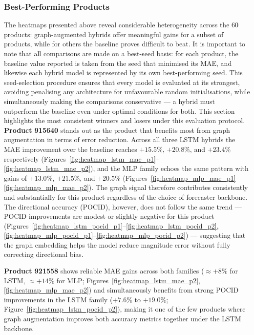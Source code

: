 \subsubsection*{Best-Performing Products}
The heatmaps presented above reveal considerable heterogeneity across the 60 products: 
graph-augmented hybrids offer meaningful gains for a subset of products, while for 
others the baseline proves difficult to beat.
It is important to note that all comparisons are made on a best-seed basis: for each 
product, the baseline value reported is taken from the seed that minimised its MAE, 
and likewise each hybrid model is represented by its own best-performing seed. 
This seed-selection procedure ensures that every model is evaluated at its strongest, 
avoiding penalising any architecture for unfavourable random initialisations, while 
simultaneously making the comparisons conservative — a hybrid must outperform the 
baseline even under optimal conditions for both.
This section highlights the most consistent winners and losers under this evaluation 
protocol.
\textbf{Product 915640} stands out as the product that benefits most from graph 
augmentation in terms of error reduction. Across all three LSTM hybrids the MAE 
improvement over the baseline reaches \(+15.5\%\), \(+20.8\%\), and \(+23.4\%\) 
respectively (Figures~\ref{fig:heatmap_lstm_mae_p1}--\ref{fig:heatmap_lstm_mae_p2}), 
and the MLP family echoes the same pattern with gains of \(+13.0\%\), \(+21.5\%\), 
and \(+20.5\%\) (Figures~\ref{fig:heatmap_mlp_mae_p1}--\ref{fig:heatmap_mlp_mae_p2}). 
The graph signal therefore contributes consistently and substantially for this product 
regardless of the choice of forecaster backbone. The directional accuracy (POCID), 
however, does not follow the same trend — POCID improvements are modest or slightly 
negative for this product (Figures~\ref{fig:heatmap_lstm_pocid_p1}--\ref{fig:heatmap_lstm_pocid_p2}, 
\ref{fig:heatmap_mlp_pocid_p1}--\ref{fig:heatmap_mlp_pocid_p2}) — suggesting that 
the graph embedding helps the model reduce magnitude error without fully correcting 
directional bias.

\textbf{Product 921558} shows reliable MAE gains across both families 
(\(\approx +8\%\) for LSTM, \(\approx +14\%\) for MLP; 
Figures~\ref{fig:heatmap_lstm_mae_p2}, \ref{fig:heatmap_mlp_mae_p2}) and 
simultaneously benefits from strong POCID improvements in the LSTM family 
(\(+7.6\%\) to \(+19.0\%\); Figure~\ref{fig:heatmap_lstm_pocid_p2}), making it 
one of the few products where graph augmentation improves both accuracy metrics 
together under the LSTM backbone.

